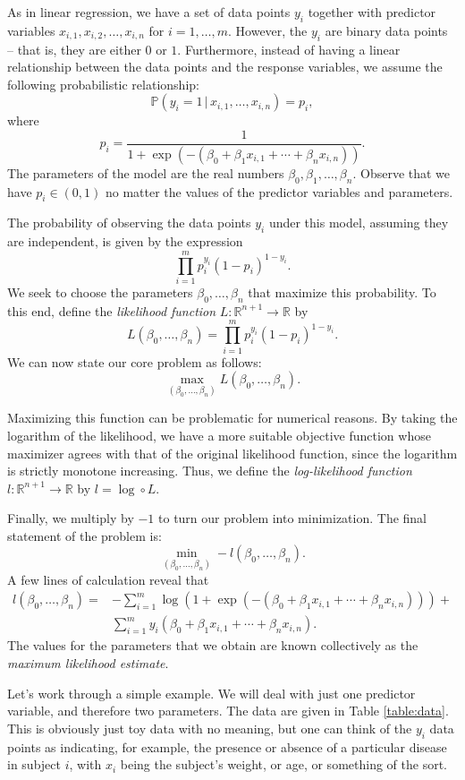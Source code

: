 As in linear regression, we have a set of data points $y_i$ together with predictor variables
$x_{i,1}, x_{i,2}, \ldots, x_{i,n}$ for $i = 1, \ldots, m$. However, the $y_i$ are binary data points --
that is, they are either $0$ or $1$. Furthermore, instead of having a linear relationship between the
data points and the response variables, we assume the following probabilistic relationship:
\[
\mathbb{P}(y_i = 1 \, | \, x_{i,1}, \ldots, x_{i,n}) = p_i,
\]
where
\[
p_i = \frac{1}{1+\exp(-(\beta_0 + \beta_1x_{i,1} + \cdots + \beta_nx_{i,n}))}.
\]
The parameters of the model are the real numbers $\beta_0, \beta_1,\ldots, \beta_n$.
Observe that we have $p_i \in (0, 1)$ no matter the values of the predictor variables and parameters.

The probability of observing the data points $y_i$ under this model, assuming they are independent, is given by
the expression
\[
\prod_{i=1}^m p_i^{y_i}(1-p_i)^{1-y_i}.
\]
We seek to choose the parameters $\beta_0, \ldots, \beta_n$ that maximize this probability.
To this end, define the \emph{likelihood function} $L:\mathbb{R}^{n+1} \rightarrow \mathbb{R}$ by
\[
L(\beta_0, \ldots, \beta_n) = \prod_{i=1}^m p_i^{y_i}(1-p_i)^{1-y_i}.
\]
We can now state our core problem as follows:
\[
\max_{(\beta_0,\ldots,\beta_n)}L(\beta_0, \ldots, \beta_n).
\]

Maximizing this function can be problematic for numerical reasons. By taking the logarithm of the likelihood,
we have a more suitable objective function whose maximizer agrees with that of the original likelihood function,
since the logarithm is strictly monotone increasing. Thus, we define the \emph{log-likelihood function}
$l : \mathbb{R}^{n+1} \rightarrow \mathbb{R}$ by $l = \log \circ L$.

Finally, we multiply by $-1$ to turn our problem into minimization. The final statement of the problem is:
\[
\min_{(\beta_0,\ldots,\beta_n)}-l(\beta_0, \ldots, \beta_n).
\]
A few lines of calculation reveal that
\begin{align*}
l(\beta_0,\ldots,\beta_n) = &-\sum_{i=1}^{m}\log(1+\exp(-(\beta_0 + \beta_1x_{i,1} + \cdots +\beta_nx_{i,n}))) +\\
 &\sum_{i=1}^m y_i(\beta_0 + \beta_1x_{i,1} + \cdots + \beta_nx_{i,n}).
\end{align*}
The values for the parameters that we obtain are known collectively as the \emph{maximum likelihood estimate}.

Let's work through a simple example. We will deal with just one predictor variable, and therefore two parameters.
The data are given in Table \ref{table:data}.
This is obviously just toy data with no meaning, but one can think of the $y_i$ data points as indicating, for example, the
presence or absence of a particular disease in subject $i$, with $x_i$ being the subject's weight, or age, or something
of the sort.

